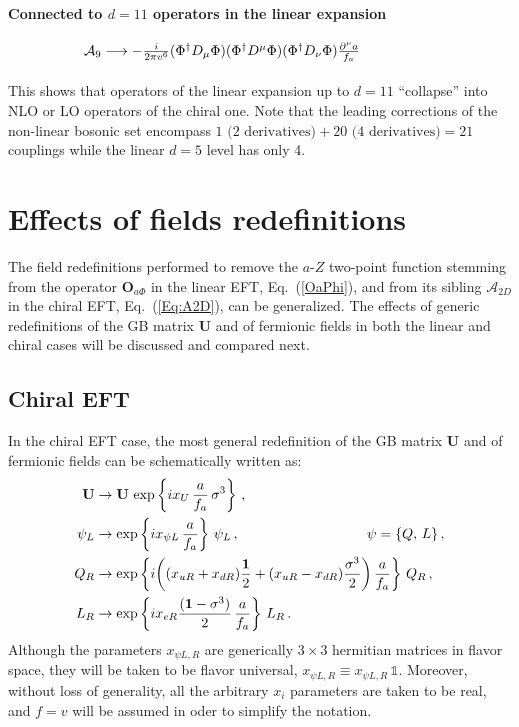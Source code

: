 \documentclass[11pt]{article}
\newcommand{\m}{\mu}
\newcommand{\s}{\sigma}
\newcommand{\f}{\Phi}
\renewcommand{\m}{\mu}
\newcommand{\n}{\nu}
\newcommand{\A}{\mathcal{A}}
\renewcommand{\O}{\mathbf{O}}
\newcommand{\U}{\mathbf{U}}
\newcommand{\fda}{\f^\dagger}
\renewcommand{\to}{\rightarrow}
\newcommand{\de}{\partial}
\renewcommand{\[}{\begin{equation}}
\renewcommand{\]}{\end{equation}}
\newcommand{\unity}{\mathbb 1}
\begin{document}
\begin{appendices}
\[\begin{array}{rl}
\end{array}
\]

\paragraph{Connected to $d=11$ operators in the linear expansion}
\[
\hspace{-1.9cm}\begin{array}{rl}
\A_9 \longrightarrow -\frac{i}{2\pi v^6}(\fda D_\m\f)(\fda D^\m\f)(\fda D_\n\f)\frac{\de^\n a}{f_a} \\[3mm]
\end{array}
\]
This shows that operators of the linear expansion up to $d=11$ ``collapse'' into NLO or LO operators of the chiral one.
Note that the leading corrections of the non-linear bosonic set encompass $1\text{ (2 derivatives)}+20\text{ (4 derivatives)}=21$ couplings while the 
linear $d=5$ level has only 4. 



\section{Effects of fields redefinitions}
\label{App:field_redef}

The field redefinitions performed to remove the $a$-$Z$ two-point function stemming from the operator $\O_{a\Phi}$ in the linear EFT, Eq.~(\ref{OaPhi}), and from its sibling $\A_{2D}$  in the chiral EFT, Eq.~(\ref{Eq:A2D}), can be generalized. The effects of generic redefinitions of the GB matrix $\U$ and of fermionic fields in both the linear and chiral cases will be discussed and compared next.

\subsection{Chiral EFT}

In the chiral EFT case, the most general redefinition of the GB matrix $\U$ and of fermionic fields can be schematically written as:
\begin{subequations}
\label{general.redef}
\begin{align}
\U &\to \U \,\exp\left\{i x_U\, \frac{a}{f_a}\, \s^3\right\}\,,\\
\psi_L &\to \exp\left\{i x_{\psi L}\, \frac{a}{f_a}\right\}\, \psi_L\,,\hspace*{3,2cm} \psi=\{Q,\,L\}\,,\\
Q_R &\to \exp\left\{i \bigg((x_{u R}+x_{d R})\frac{\mathbf{1}}{2}+(x_{u R}-x_{d R})\frac{\s^3}{2}\bigg)\,\frac{a}{f_a}\right\}\,Q_R\,,\\
L_R &\to \exp\left\{i x_{e R}\frac{(\mathbf{1}-\s^3)}{2}\,\frac{a}{f_a}\right\}\,L_R\,.
\end{align}
\end{subequations}
Although the parameters $x_{\psi L,R}$ are generically $3\times3$ hermitian matrices in flavor space, they will be taken to be flavor universal, $x_{\psi L,R}\equiv x_{\psi L,R}\,\unity$. Moreover, without loss of generality, all the arbitrary $x_i$ parameters are taken to be real, and $f=v$ will be assumed in oder to simplify the notation.


\end{appendices}
\end{document}
